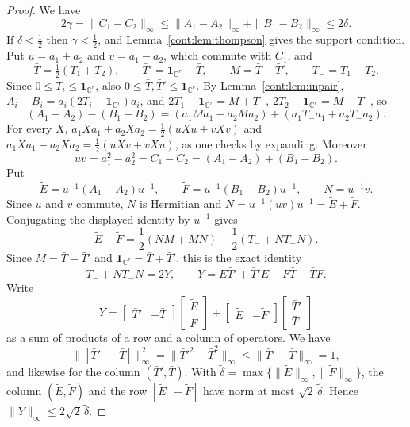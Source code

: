 \begin{proof}
We have
\[
2\gamma=\|C_1-C_2\|_\infty\leq\|A_1-A_2\|_\infty+\|B_1-B_2\|_\infty\leq2\delta.
\]
If $\delta<\frac12$ then $\gamma<\frac12$, and Lemma~\ref{cont:lem:thompson} gives the support condition. Put $u=a_1+a_2$ and $v=a_1-a_2$, which commute with $C_1$, and
\[
\bar T=\tfrac12(T_1+T_2),\qquad\bar T'=\mathbf{1}_{\mathbb{C}^r}-\bar T,\qquad M=\bar T-\bar T',\qquad T_-=T_1-T_2 .
\]
Since $0\leq T_i\leq\mathbf{1}_{\mathbb{C}^r}$, also $0\leq\bar T,\bar T'\leq\mathbf{1}_{\mathbb{C}^r}$. By Lemma~\ref{cont:lem:inpair}, $A_i-B_i=a_i(2T_i-\mathbf{1}_{\mathbb{C}^r})a_i$, and $2T_1-\mathbf{1}_{\mathbb{C}^r}=M+T_-$, $2T_2-\mathbf{1}_{\mathbb{C}^r}=M-T_-$, so
\[
(A_1-A_2)-(B_1-B_2)=(a_1Ma_1-a_2Ma_2)+(a_1T_-a_1+a_2T_-a_2).
\]
For every $X$, $a_1Xa_1+a_2Xa_2=\frac12(uXu+vXv)$ and $a_1Xa_1-a_2Xa_2=\frac12(uXv+vXu)$, as one checks by expanding. Moreover
\[
uv=a_1^2-a_2^2=C_1-C_2=(A_1-A_2)+(B_1-B_2).
\]
Put
\[
\tilde E=u^{-1}(A_1-A_2)u^{-1},\qquad\tilde F=u^{-1}(B_1-B_2)u^{-1},\qquad N=u^{-1}v .
\]
Since $u$ and $v$ commute, $N$ is Hermitian and $N=u^{-1}(uv)u^{-1}=\tilde E+\tilde F$. Conjugating the displayed identity by $u^{-1}$ gives
\[
\tilde E-\tilde F=\frac12(NM+MN)+\frac12(T_-+NT_-N).
\]
Since $M=\bar T-\bar T'$ and $\mathbf{1}_{\mathbb{C}^r}=\bar T+\bar T'$, this is the exact identity
\begin{equation}\label{cont:eq:one parameter identity}
T_-+NT_-N=2Y,\qquad Y=\tilde E\bar T'+\bar T'\tilde E-\tilde F\bar T-\bar T\tilde F .
\end{equation}
Write
\[
Y=\begin{bmatrix}\bar T'&-\bar T\end{bmatrix}\begin{bmatrix}\tilde E\\\tilde F\end{bmatrix}+\begin{bmatrix}\tilde E&-\tilde F\end{bmatrix}\begin{bmatrix}\bar T'\\\bar T\end{bmatrix}
\]
as a sum of products of a row and a column of operators. We have
\[
\|[\bar T'\ \ -\bar T]\|_\infty^2=\|\bar T'^2+\bar T^2\|_\infty\leq\|\bar T'+\bar T\|_\infty=1,
\]
and likewise for the column $(\bar T',\bar T)$. With $\tilde\delta=\max\{\|\tilde E\|_\infty,\|\tilde F\|_\infty\}$, the column $(\tilde E,\tilde F)$ and the row $[\tilde E\ \ -\tilde F]$ have norm at most $\sqrt2\,\tilde\delta$. Hence $\|Y\|_\infty\leq2\sqrt2\,\tilde\delta$.


\end{proof}
